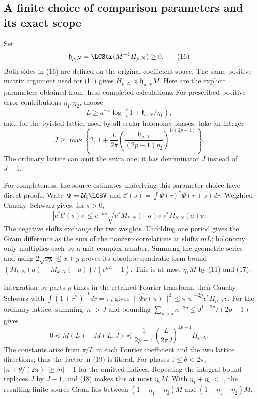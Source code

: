 \documentclass[10pt,a4paper,oneside]{report}
\begin{document}
\subsection{A finite choice of comparison parameters and its exact scope}
Set
\[
 \mathfrak h_{p,N}=\LCStr(M^{-1}H_{p,N})\ge0.
 \tag{16}
\]
Both sides in (16) are defined on the original coefficient space.
The same positive-matrix argument used for (11) gives
\(H_{p,N}\preceq\mathfrak h_{p,N}M\).
Here are the explicit parameters obtained from these completed
calculations. For prescribed positive error contributions
\(\eta_1,\eta_2\), choose
\[
 L\ge a^{-1}\log(1+\mathfrak k_{a,N}/\eta_1),
 \tag{17}
\]
and, for the twisted lattice used by all scalar holonomy phases, take an integer
\[
 J\ge\max\left\{2,\,
 1+\frac L{2\pi}
 \left(\frac{\mathfrak h_{p,N}}{(2p-1)\eta_2}\right)^{1/(2p-1)}
 \right\}.
 \tag{18}
\]
The ordinary lattice can omit the extra one; it has denominator
\(J\) instead of \(J-1\).

For completeness, the source estimates underlying this parameter
choice have direct proofs. Write \(\Psi=\mathcal U_k\LCSV\) and
\(\mathcal C(s)=\int\Psi(r)^*\Psi(r+s)dr\). Weighted
Cauchy--Schwarz gives, for \(s>0\),
\[
 |v^*\mathcal C(s)v|
 \le e^{-as}\sqrt{v^*M_{k,N}(-a)v\ v^*M_{k,N}(a)v}.
\]
The negative shifts exchange the two weights. Unfolding one period
gives the Gram difference as the sum of the nonzero correlations
at shifts \(mL\); holonomy only multiplies each by a unit complex
number. Summing the geometric series and using \(2\sqrt{xy}\le x+y\)
proves its absolute quadratic-form bound
\((M_{k,N}(a)+M_{k,N}(-a))/(e^{aL}-1)\).
This is at most \(\eta_1M\) by (11) and (17).

Integration by parts \(p\) times in the retained Fourier transform,
then Cauchy--Schwarz with
\(\int(1+r^2)^{-1}dr=\pi\), gives
\(\|\widehat{\Psi v}(u)\|^2\le
\pi |u|^{-2p}v^*H_{p,N}v\).
For the ordinary lattice, summing \(|n|>J\) and bounding
\(\sum_{n>J}n^{-2p}\le J^{1-2p}/(2p-1)\) gives
\[
 0\preceq M(L)-M(L,J)
 \preceq\frac1{2p-1}\left(\frac L{2\pi J}\right)^{2p-1}H_{p,N}.
 \tag{19}
\]
The constants arise from \(\pi/L\) in each Fourier coefficient and
the two lattice directions; thus the factor in (19) is literal.
For phases \(0\le\theta<2\pi\),
\(|n+\theta/(2\pi)|\ge |n|-1\) for the omitted indices. Repeating
the integral bound replaces \(J\) by \(J-1\), and (18) makes this
at most \(\eta_2M\). With \(\eta_1+\eta_2<1\), the resulting
finite source Gram lies between
\((1-\eta_1-\eta_2)M\) and
\((1+\eta_1+\eta_2)M\).
\end{document}
